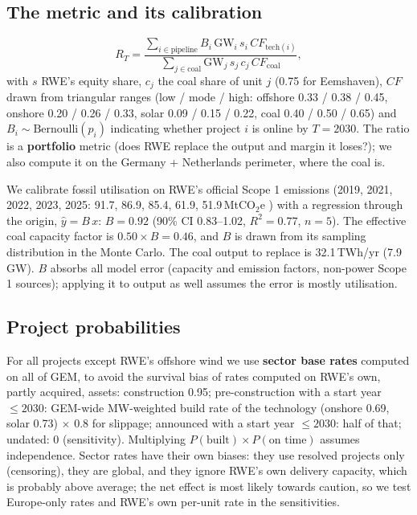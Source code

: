 \documentclass[11pt,a4paper]{article}
\begin{document}
\subsection{The metric and its calibration}
\begin{equation}
R_T=\frac{\sum_{i\in\text{pipeline}} B_i\,\mathrm{GW}_i\,s_i\,CF_{\text{tech}(i)}}{\sum_{j\in\text{coal}} \mathrm{GW}_j\,s_j\,c_j\,CF_{\text{coal}}},
\end{equation}
with $s$ RWE's equity share, $c_j$ the coal share of unit $j$ (0.75 for Eemshaven), $CF$ drawn from triangular ranges (low / mode / high: offshore 0.33 / 0.38 / 0.45, onshore 0.20 / 0.26 / 0.33, solar 0.09 / 0.15 / 0.22, coal 0.40 / 0.50 / 0.65) and $B_i\sim\text{Bernoulli}(p_i)$ indicating whether project $i$ is online by $T=2030$. The ratio is a \textbf{portfolio} metric (does RWE replace the output and margin it loses?); we also compute it on the Germany + Netherlands perimeter, where the coal is.

We calibrate fossil utilisation on RWE's official Scope 1 emissions (2019, 2021, 2022, 2023, 2025: 91.7, 86.9, 85.4, 61.9, 51.9\,MtCO$_2$e \cite{rwefact2026,rwespr2023}) with a regression through the origin, $\hat y=B\,x$: $B=0.92$ (90\% CI 0.83--1.02, $R^2=0.77$, $n=5$). The effective coal capacity factor is $0.50\times B=0.46$, and $B$ is drawn from its sampling distribution in the Monte Carlo. The coal output to replace is 32.1\,TWh/yr (7.9\,GW). $B$ absorbs all model error (capacity and emission factors, non-power Scope 1 sources); applying it to output as well assumes the error is mostly utilisation.

\subsection{Project probabilities}
For all projects except RWE's offshore wind we use \textbf{sector base rates} computed on all of GEM, to avoid the survival bias of rates computed on RWE's own, partly acquired, assets: construction 0.95; pre-construction with a start year $\le2030$: GEM-wide MW-weighted build rate of the technology (onshore 0.69, solar 0.73) $\times$ 0.8 for slippage; announced with a start year $\le2030$: half of that; undated: 0 (sensitivity). Multiplying $P(\text{built})\times P(\text{on time})$ assumes independence. Sector rates have their own biases: they use resolved projects only (censoring), they are global, and they ignore RWE's own delivery capacity, which is probably above average; the net effect is most likely towards caution, so we test Europe-only rates and RWE's own per-unit rate in the sensitivities.
\end{document}
